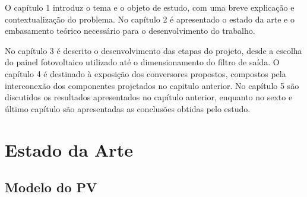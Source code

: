 \documentclass[
	12pt,				%
	openright,			%
	twoside,			%
	a4paper,			%
	english,			%
	french,				%
	spanish,			%
	brazil,				%
	]{abntex2}
\begin{document}
O capítulo 1 introduz o tema e o objeto de estudo, com uma breve explicação e contextualização do problema. No capítulo 2 é apresentado o estado da arte e o embasamento teórico necessário para o desenvolvimento do trabalho.

No capítulo 3 é descrito o desenvolvimento das etapas do projeto, desde a escolha do painel fotovoltaico utilizado até o dimensionamento do filtro de saída. O capítulo 4 é destinado à exposição dos conversores propostos, compostos pela interconexão dos componentes projetados no capitulo anterior. No capítulo 5 são discutidos os resultados apresentados no capítulo anterior, enquanto no sexto e último capítulo são apresentadas as conclusões obtidas pelo estudo.

\chapter{Estado da Arte}

\section{Modelo do PV}
\end{document}
